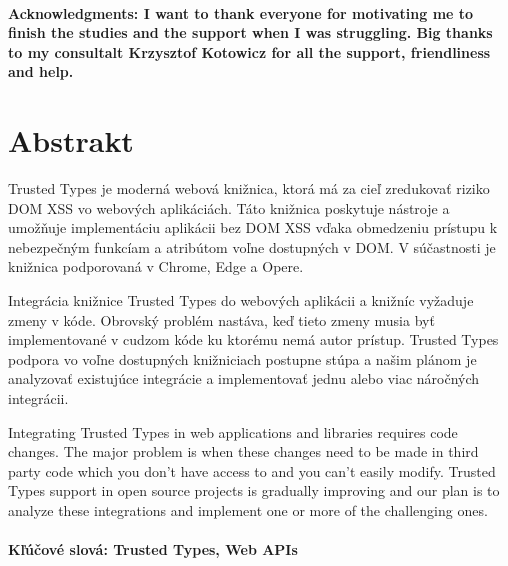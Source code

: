\documentclass[12pt, twoside]{book}
\begin{document}
\newpage
\thispagestyle{empty}



\frontmatter

\setcounter{page}{3}
\newpage
~

\vfill
{\bf Acknowledgments: I want to thank everyone for motivating me to finish the studies and the
  support when I was struggling. Big thanks to my consultalt Krzysztof Kotowicz for all the support,
  friendliness and help.}


\newpage
\section*{Abstrakt}

Trusted Types je moderná webová knižnica, ktorá má za cieľ zredukovať riziko DOM XSS vo webových
aplikáciách. Táto knižnica poskytuje nástroje a umožňuje implementáciu aplikácii bez DOM XSS vďaka
obmedzeniu prístupu k nebezpečným funkcíam a atribútom voľne dostupných v DOM. V súčastnosti je
knižnica podporovaná v Chrome, Edge a Opere.

Integrácia knižnice Trusted Types do webových aplikácii a knižníc vyžaduje zmeny v kóde. Obrovský
problém nastáva, keď tieto zmeny musia byť implementované v cudzom kóde ku ktorému nemá autor
prístup. Trusted Types podpora vo voľne dostupných knižniciach postupne stúpa a našim plánom je
analyzovať existujúce integrácie a implementovať jednu alebo viac náročných integrácii.

Integrating Trusted Types in web applications and libraries requires code changes. The major problem
is when these changes need to be made in third party code which you don't have access to and you
can't easily modify. Trusted Types support in open source projects is gradually improving and our
plan is to analyze these integrations and implement one or more of the challenging ones.

\paragraph*{Kľúčové slová: Trusted Types, Web APIs}
\end{document}
